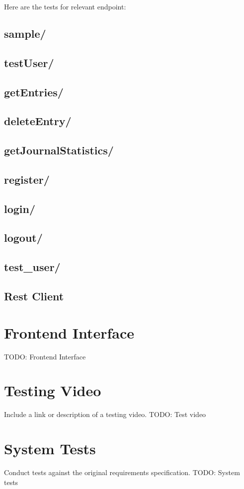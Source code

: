 Here are the tests for relevant endpoint:
\subsection{sample/}
\subsection{testUser/}
\subsection{getEntries/}
\subsection{deleteEntry/}
\subsection{getJournalStatistics/}
\subsection{register/}
\subsection{login/}
\subsection{logout/}
\subsection{test\_user/}


\subsection{Rest Client}


\section{Frontend Interface}    
TODO: Frontend Interface

\section{Testing Video}
Include a link or description of a testing video.
TODO: Test video

\section{System Tests}
Conduct tests against the original requirements specification.
TODO: System tests



